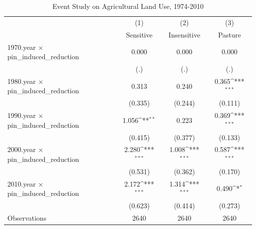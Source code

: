 \begin{table}[htbp]\centering
\def\sym#1{\ifmmode^{#1}\else\(^{#1}\)\fi}
\caption{Event Study on Agricultural Land Use, 1974-2010}
\begin{tabular}{l*{3}{c}}
\hline\hline
                    &\multicolumn{1}{c}{(1)}         &\multicolumn{1}{c}{(2)}         &\multicolumn{1}{c}{(3)}         \\
                    &   Sensitive         & Insensitive         &     Pasture         \\
\hline
1970.year $\times$ pin\_induced\_reduction&       0.000         &       0.000         &       0.000         \\
                    &         (.)         &         (.)         &         (.)         \\
1980.year $\times$ pin\_induced\_reduction&       0.313         &       0.240         &       0.365\sym{***}\\
                    &     (0.335)         &     (0.244)         &     (0.111)         \\
1990.year $\times$ pin\_induced\_reduction&       1.056\sym{**} &       0.223         &       0.369\sym{***}\\
                    &     (0.415)         &     (0.377)         &     (0.133)         \\
2000.year $\times$ pin\_induced\_reduction&       2.280\sym{***}&       1.008\sym{***}&       0.587\sym{***}\\
                    &     (0.531)         &     (0.362)         &     (0.170)         \\
2010.year $\times$ pin\_induced\_reduction&       2.172\sym{***}&       1.314\sym{***}&       0.490\sym{*}  \\
                    &     (0.623)         &     (0.414)         &     (0.273)         \\
Observations        &        2640         &        2640         &        2640         \\
\hline\hline
\end{tabular}
\end{table}
